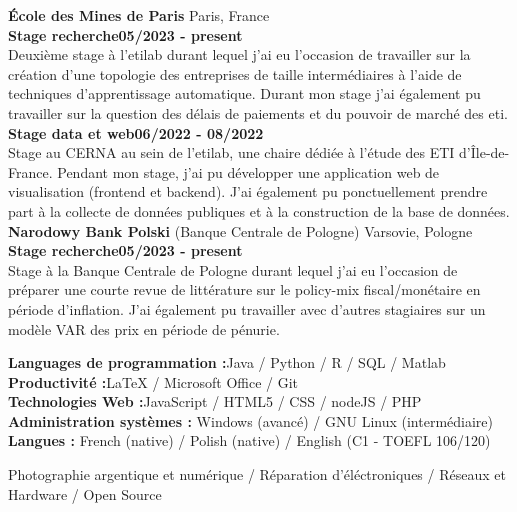 \documentclass[11pt]{report}
\begin{document}
	\begin{flushleft}
	\raisebox{-.6ex}{EXPÉRIENCES PROFESSIONNELLES} \hrulefill
	\end{flushleft}


\noindent\textbf{École des Mines de Paris} \hfill Paris, France\\[0.1cm]
\textbf{Stage recherche}\hfill \textbf{05/2023 - present} \\
Deuxième stage à l'etilab durant lequel j'ai eu l'occasion de travailler sur la création d'une topologie des entreprises de taille intermédiaires à l'aide de techniques d'apprentissage automatique. Durant mon stage j'ai également pu travailler sur la question des délais de paiements et du pouvoir de marché des eti. \\[0.15cm]
\textbf{Stage data et web}\hfill \textbf{06/2022 - 08/2022} \\
Stage au CERNA au sein de l'etilab, une chaire dédiée à l'étude des ETI d'Île-de-France. Pendant mon stage, j'ai pu développer une application web de visualisation (frontend et backend).
J'ai également pu ponctuellement prendre part à la collecte de données publiques et à la construction de la base de données. \\

\noindent\textbf{Narodowy Bank Polski} (Banque Centrale de Pologne) \hfill Varsovie, Pologne \\[0.1cm]
\textbf{Stage recherche}\hfill \textbf{05/2023 - present} \\
Stage à la Banque Centrale de Pologne durant lequel j'ai eu l'occasion de préparer une courte revue de littérature sur le policy-mix fiscal/monétaire en période d'inflation. J'ai également pu travailler avec d'autres stagiaires sur un modèle VAR des prix en période de pénurie. 

	\begin{flushleft}
	\raisebox{-.6ex}{COMPÉTENCES} \hrulefill
	\end{flushleft}



  \noindent\textbf{Languages de programmation :}\hfill{Java / Python / R / SQL / Matlab} \\
  \textbf{Productivité :}\hfill LaTeX / Microsoft Office / Git\\
  \textbf{Technologies Web :}\hfill JavaScript / HTML5 / CSS / nodeJS / PHP  \\
  \textbf{Administration systèmes :} \hfill Windows (avancé) / GNU Linux (intermédiaire)\\
  \textbf{Langues :} \hfill French (native) / Polish (native) / English (C1 - TOEFL 106/120) 

	\begin{flushleft}
	\raisebox{-.6ex}{LOISIRS} \hrulefill
	\end{flushleft}

\noindent Photographie argentique et numérique / Réparation d'éléctroniques / Réseaux et Hardware / Open Source
\end{document}
